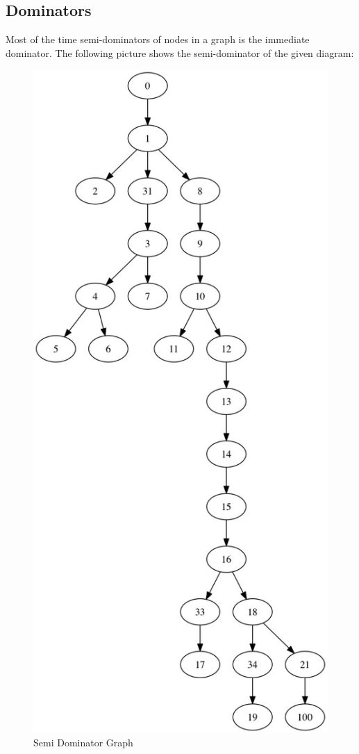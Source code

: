\documentclass[12pt]{article}
\begin{document}
\subsection{Dominators}
Most of the time semi-dominators of nodes in a graph is the immediate
dominator. The following picture shows the semi-dominator of the given
diagram:

\begin{figure}
\centering
\includegraphics[scale=0.35]{imdom.jpg}
\caption{Semi Dominator Graph}
\end{figure}
\end{document}
